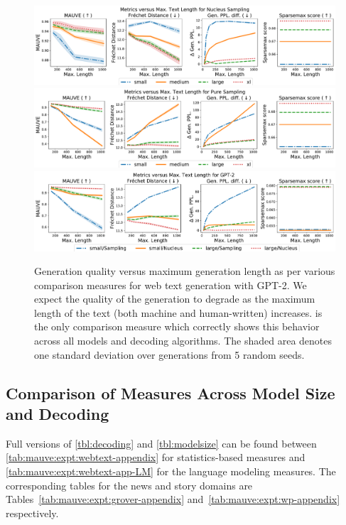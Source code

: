 \documentclass{article}
\theoremstyle{definition}
\newcommand{\name}{{\fontfamily{bch}\selectfont{\textsc{Mauve}}}\xspace}
\begin{document}
\begin{figure}[t]
\includegraphics[width=0.97\linewidth]{fig/length/nucleus_main.pdf}
\includegraphics[width=0.97\linewidth]{fig/length/sampling_main.pdf}
%
\includegraphics[width=0.97\linewidth]{fig/length/mix1_main.pdf}
\caption{Generation quality versus maximum generation length as per various comparison measures for 
web text generation with GPT-2. 
We expect the quality of the generation to degrade as the maximum length of the text (both machine and human-written) increases. 
\name is the only comparison measure which correctly shows this behavior across all models and decoding algorithms.
%
%
%
%
%
%
%
%
%
%
The shaded area denotes one standard deviation over generations from 5 random seeds.
}
\label{fig:a:expt:length:all}
\end{figure}




\subsection{Comparison of Measures Across Model Size and Decoding} \label{sec:supp:expt-size_decoding}

%
Full versions of \autoref{tbl:decoding} and \autoref{tbl:modelsize}
can be found between \autoref{tab:mauve:expt:webtext-appendix} for statistics-based measures
and \autoref{tab:mauve:expt:webtext-app-LM} for the language modeling measures. 
The corresponding tables
for the news and story domains are
Tables~\ref{tab:mauve:expt:grover-appendix}
and~\ref{tab:mauve:expt:wp-appendix} respectively. 
%
\end{document}
